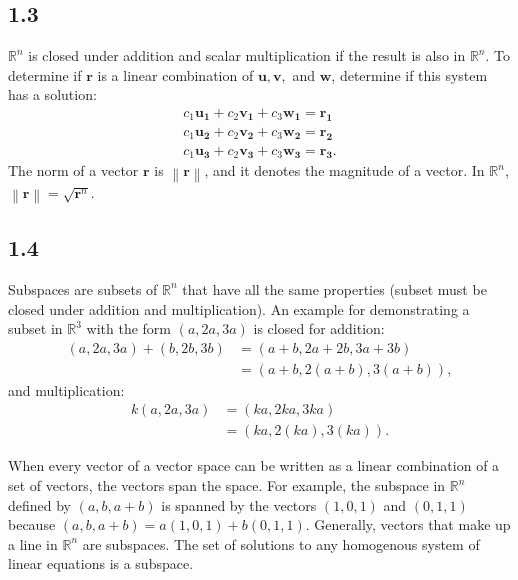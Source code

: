 \documentclass{article}
\newcommand{\norm}[1]{\left\lVert#1\right\rVert}
\begin{document}
    \subsection*{1.3}
    $\mathbb{R}^n$ is closed under addition and scalar multiplication if the result is also in $\mathbb{R}^n$. 
    To determine if $\mathbf{r}$ is a linear combination of $\mathbf{u, v,}$ and $\mathbf{w}$, 
    determine if this system has a solution: 
    \begin{gather*}
        c_1\mathbf{u_1} + c_2\mathbf{v_1} + c_3\mathbf{w_1} = \mathbf{r_1} \\
        c_1\mathbf{u_2} + c_2\mathbf{v_2} + c_3\mathbf{w_2} = \mathbf{r_2} \\
        c_1\mathbf{u_3} + c_2\mathbf{v_3} + c_3\mathbf{w_3} = \mathbf{r_3}.
    \end{gather*}
    The norm of a vector $\mathbf{r}$ is $\norm{\mathbf{r}}$, and it denotes the magnitude of a vector. 
    In $\mathbb{R}^n$, $\norm{\mathbf{r}} = \sqrt{\mathbf{r}^n}$.

    \subsection*{1.4}
    Subspaces are subsets of $\mathbb{R}^n$ that have all the same properties (subset must be closed under addition and multiplication).
    An example for demonstrating a subset in $\mathbb{R}^3$ with the form $(a, 2a, 3a)$ is closed for addition: 
    \begin{align*}
       (a, 2a, 3a) + (b, 2b, 3b) &= (a + b, 2a + 2b, 3a + 3b) \\
       &= (a + b, 2(a +b), 3(a + b)), 
    \end{align*}
    and multiplication: 
    \begin{align*}
        k(a, 2a, 3a) &= (ka, 2ka, 3ka) \\
        &= (ka, 2(ka), 3(ka)).
    \end{align*}


    When every vector of a vector space can be written as a linear combination of a set of vectors, the vectors span the space.
    For example, the subspace in $\mathbb{R}^n$ defined by $(a, b, a+b)$ is spanned by the vectors $(1, 0, 1)$ and $(0, 1, 1)$
    because $(a, b, a+b) = a(1, 0, 1) + b(0, 1, 1)$. Generally, vectors that make up a line in $\mathbb{R}^n$ are subspaces.
    The set of solutions to any homogenous system of linear equations is a subspace.
\end{document}
